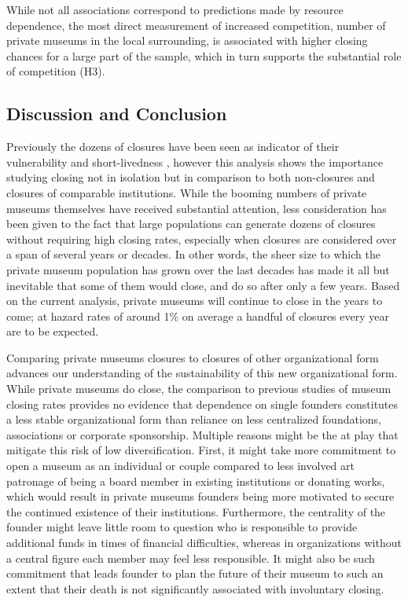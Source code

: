 \documentclass[12pt]{article}
\begin{document}
While not all associations correspond to predictions made by resource dependence, the most direct measurement of increased competition, number of private museums in the local surrounding, is associated with higher closing chances for a large part of the sample, which in turn supports the substantial role of competition (H3).
\subsection*{Discussion and Conclusion}





Previously the dozens of closures have been seen as indicator of their vulnerability and short-livedness \parencite{Adam_2020_close}, however this analysis shows the importance studying closing not in isolation but in comparison to both non-closures and closures of comparable institutions.
While the booming numbers of private museums themselves have received substantial attention, less consideration has been given to the fact that large populations can generate dozens of closures without requiring high closing rates, especially when closures are considered over a span of several years or decades.
In other words, the sheer size to which the private museum population has grown over the last decades has made it all but inevitable that some of them would close, and do so after only a few years.
Based on the current analysis, private museums will continue to close in the years to come; at hazard rates of around 1\% on average a handful of closures every year are to be expected.



Comparing private museums closures to closures of other organizational form advances our understanding of the sustainability of this new organizational form.
While private museums do close, the comparison to previous studies of museum closing rates provides no evidence that dependence on single founders constitutes a less stable organizational form than reliance on less centralized foundations, associations or corporate sponsorship.
Multiple reasons might be the at play that mitigate this risk of low diversification.
First, it might take more commitment to open a museum as an individual or couple compared to less involved art patronage of being a board member in existing institutions or donating works, which would result in private museums founders being more motivated to secure the continued existence of their institutions.
Furthermore, the centrality of the founder might leave little room to question who is responsible to provide additional funds in times of financial difficulties, whereas in organizations without a central figure each member may feel less responsible.
It might also be such commitment that leads founder to plan the future of their museum to such an extent that their death is not significantly associated with involuntary closing.
\end{document}
